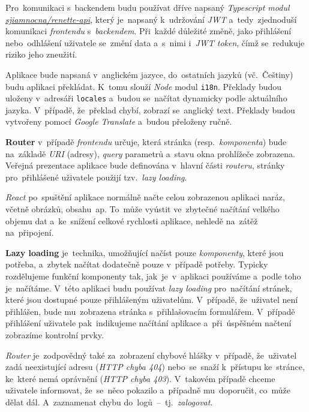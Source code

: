 \documentclass[11pt,a4paper]{report}
\begin{document}
            Pro~komunikaci s~backendem budu používat dříve napsaný \emph{Typescript modul} \href{https://gitlab.com/sjiamnocna/renette-api}{\emph{sjiamnocna/renette-api}}, který je~napsaný k~udržování \emph{JWT} a~tedy~zjednoduší komunikaci \emph{frontendu} s~\emph{backendem}. Při~každé důležité změně, jako přihlášení nebo~odhlášení uživatele se~změní data a~s~nimi i~\emph{JWT token}, čímž se~redukuje riziko jeho zneužití.

            Aplikace bude napsaná v~anglickém jazyce, do~ostatních jazyků (vč.~Češtiny) budu aplikaci překládat. K~tomu slouží \emph{Node} modul \texttt{i18n}. Překlady budou uloženy v~adresáři \texttt{locales} a~budou se~načítat dynamicky podle aktuálního jazyka. V~případě, že~překlad chybí, zobrazí se~anglický text. Překlady budou vytvořeny pomocí \emph{Google Translate} a~budou přeloženy ručně.

            \textbf{Router} v~případě \emph{frontendu} určuje, která stránka (resp.~\emph{komponenta}) bude na~základě \emph{URI} (adresy), \emph{query} parametrů a~stavu okna prohlížeče zobrazena. Veřejná prezentace aplikace bude definována v~hlavní části \emph{routeru}, stránky pro~přihlášené uživatele použijí tzv.~\emph{lazy loading}.

            \emph{React} po~spuštění aplikace normálně načte celou zobrazenou aplikaci naráz, včetně obrázků, obsahu~ap. To~může vyústit ve~zbytečné načítání velkého objemu dat a~ke~snížení celkové rychlosti aplikace, nehledě na~zátěž na~připojení.

            \textbf{Lazy loading} je~technika, umožňující načíst pouze \emph{komponenty}, které jsou potřeba, a~zbytek načítat dodatečně pouze v~případě potřeby. Typicky rozdělujeme funkční komponenty tak, jak~je~v~aplikaci používáme a~podle toho je~načítáme. V~této aplikaci budu používat \emph{lazy loading} pro~načítání stránek, které jsou dostupné pouze přihlášeným uživatelům. V~případě, že~uživatel není přihlášen, bude mu~zobrazena stránka s~přihlašovacím formulářem. V~případě přihlášení uživatele pak~indikujeme načítání aplikace a~při~úspěšném načtení zobrazíme kontrolní prvky.

            \emph{Router} je~zodpovědný také za~zobrazení chybové hlášky v~případě, že~uživatel zadá neexistující adresu (\emph{HTTP chyba 404}) nebo~se~snaží k~přístupu ke~stránce, ke~které nemá oprávnění (\emph{HTTP chyba 403}). V~takovém případě chceme uživatele informovat, že~se~něco pokazilo a~případně mu~doporučit, co~může dělat dál. A~zaznamenat chybu do~logů~--~tj.~\emph{zalogovat}.
            
\end{document}
